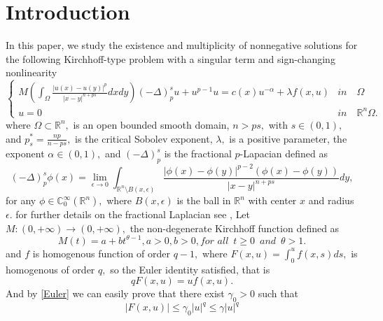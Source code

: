 \documentclass[10pt,twoside,reqno,centertags,draft]{amsart}
\begin{document}
\section{Introduction}
In this paper, we study the existence and multiplicity of nonnegative solutions for the following Kirchhoff-type problem with a singular term and sign-changing nonlinearity
\begin{equation} \label{p0}
\begin{cases}
M( \int_{\Omega} \frac{\vert u(x) - u(y) \vert^{p}}{\vert x-y \vert^{n + ps}}dxdy)\left(-\Delta\right)_{p}^{s}u + u^{p-1}u = c(x)u^{-\alpha} + \lambda f(x,u) & \textit{in} \quad \Omega\\
u = 0 &  \textit{in} \quad \mathbb{R}^n\Omega.
\end{cases}
\end{equation}
where  $\Omega \subset \mathbb{R}^n,$ is an open bounded smooth domain, $ n > ps,$ with $ s \in (0,1),$ and $ p_s^* = \frac{np}{n-ps},$ is the critical Sobolev exponent, $ \lambda,$ is a positive parameter, the exponent $ \alpha \in (0,1),$ and $ \left(-\Delta\right)_{p}^{s}$ is the fractional $ p$-Lapacian defined as 
\begin{equation*}
 \left(-\Delta\right)_{p}^{s} \phi(x) = \lim_{\epsilon \to 0}\int_{\mathbb{R}^n\setminus B(x,\epsilon)}\frac{\vert \phi(x) -\phi(y)\vert^{p -2}(\phi(x) -\phi(y))}{\vert x -y\vert^{n +ps}}dy,
\end{equation*}
for any $ \phi \in \mathbb{C}_{0}^{\infty}(\mathbb{R}^{n}),$ where  $ B(x,\epsilon)$ is the ball in $ \mathbb{R}^n$ with center $ x$ and radius $ \epsilon.$
for further details on the fractional Laplacian see \cite{di2012hitchhikers}, \cite{xiang2016existence}\newline
Let $ M : (0,+\infty) \longrightarrow (0, +\infty),$ the non-degenerate Kirchhoff function defined as 
\begin{equation}\label{kf}
M(t) = a + b t^{\theta-1},  a > 0 , b> 0 , \textit{for all} \,\,\, t \geq 0 \,\,\, \textit{and} \,\,\, \theta > 1.
\end{equation}
and $ f$ is homogenous function of order $ q-1,$ where $ F(x,u) = \int_{0}^{u} f(x,s)ds,$ is homogenous of order $ q,$ so the Euler identity satisfied, that is 
\begin{equation}\label{Euler}
q F(x,u) = uf(x,u). 
\end{equation}
And by \ref{Euler} we can easily prove that there exist $ \gamma_0 >0$ such that
\begin{equation*}
\vert F(x,u) \vert \leq \gamma_0 \vert u \vert^{q} \leq \gamma \vert u \vert^{q}
\end{equation*}
\end{document}
